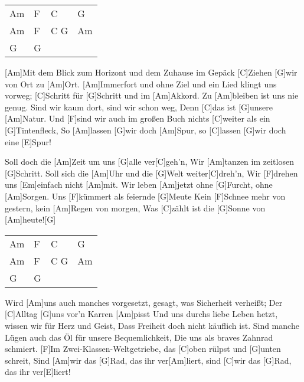 



\begin{guitar}
	{\footnotesize\begin{tabular}{|l|l|l|l|}
			Am & F & C & G \\
			Am & F & C G & Am \\
			G & G & & 
	\end{tabular}}
	
	[Am]Mit dem Blick zum Horizont und dem Zuhause im Gepäck
	[C]Ziehen [G]wir von Ort zu [Am]Ort.
	[Am]Immerfort und ohne Ziel und ein Lied klingt uns vorweg;
	[C]Schritt für [G]Schritt und im [Am]Akkord.
	Zu [Am]bleiben ist uns nie genug. Sind wir kaum dort, sind wir schon weg,
	Denn [C]das ist [G]unsere [Am]Natur.
	Und [F]sind wir auch im großen Buch nichts [C]weiter als ein [G]Tintenfleck,
	So [Am]lassen [G]wir doch [Am]Spur, so [C]lassen [G]wir doch eine [E]Spur!
	
	\begin{highlightbar}
		Soll doch die [Am]Zeit um uns [G]alle ver[C]geh'n,
		Wir [Am]tanzen im zeitlosen [G]Schritt.
		Soll sich die [Am]Uhr und die [G]Welt weiter[C]dreh'n, 
		Wir [F]drehen uns [Em]einfach nicht [Am]mit.
		Wir leben [Am]jetzt ohne [G]Furcht, ohne [Am]Sorgen.
		Uns [F]kümmert als feiernde [G]Meute
		Kein [F]Schnee mehr von gestern, kein [Am]Regen von morgen,
		Was [C]zählt ist die [G]Sonne von [Am]heute![G]{}
	\end{highlightbar}
	
	{\footnotesize\begin{tabular}{|l|l|l|l|}
			Am & F & C & G  \\
			Am & F & C G & Am \\
			G & G & & 
	\end{tabular}}
	\pagebreak
	Wird [Am]uns auch manches vorgesetzt, gesagt, was Sicherheit verheißt;
	Der [C]Alltag [G]uns vor'n Karren [Am]pisst
	Und uns durchs liebe Leben hetzt, wissen wir für Herz und Geist,
	Dass Freiheit doch nicht käuflich ist.
	Sind manche Lügen auch das Öl für unsere Bequemlichkeit,
	Die uns als braves Zahnrad schmiert.
	[F]Im Zwei-Klassen-Weltgetriebe, das [C]oben rülpst und [G]unten schreit,
	Sind [Am]wir das [G]Rad, das ihr ver[Am]liert, sind [C]wir das [G]Rad, das ihr ver[E]liert!
	

\end{guitar}
